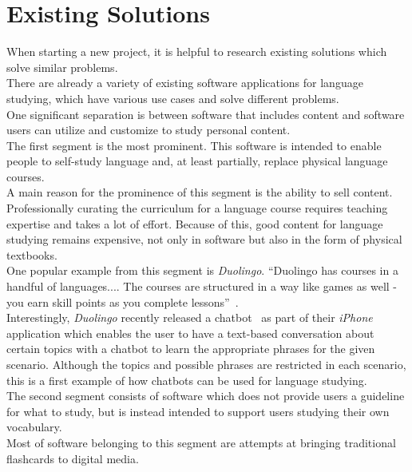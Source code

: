\section{Existing Solutions}
\label{existing}


When starting a new project, it is helpful to research existing solutions which solve similar problems.
\\
There are already a variety of existing software applications for language studying, which have various use cases and solve different problems.
\\

One significant separation is between software that includes content and software users can utilize and customize to study personal content.
\\

The first segment is the most prominent.
This software is intended to enable people to self-study language and, at least partially, replace physical language courses.
\\
A main reason for the prominence of this segment is the ability to sell content.
Professionally curating the curriculum for a language course requires teaching expertise and takes a lot of effort.
Because of this, good content for language studying remains expensive, not only in software but also in the form of physical textbooks.
\\
One popular example from this segment is \emph{Duolingo}. ``Duolingo has courses in a handful of languages.... The courses are structured in a way like games as well - you earn skill points as you complete lessons''~\cite{lifehacker}.
\\
Interestingly, \emph{Duolingo} recently released a chatbot~\cite{topbots2} as part of their \emph{iPhone} application which enables the user to have a text-based conversation about certain topics with a chatbot to learn the appropriate phrases for the given scenario.
Although the topics and possible phrases are restricted in each scenario, this is a first example of how chatbots can be used for language studying.
\\

The second segment consists of software which does not provide users a guideline for what to study, but is instead intended to support users studying their own vocabulary.
\\
Most of software belonging to this segment are attempts at bringing traditional flashcards to digital media.
\\

